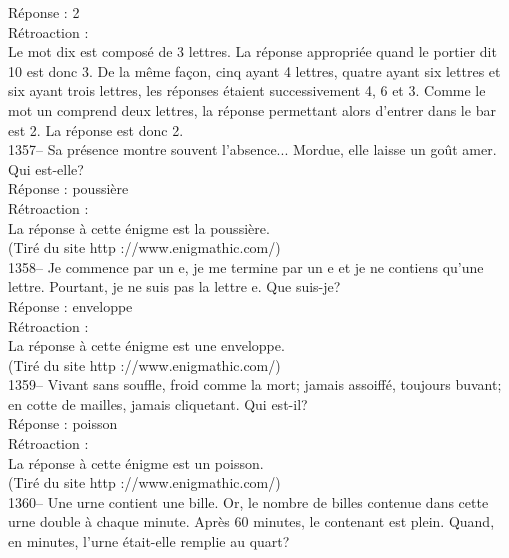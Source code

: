 ﻿\documentclass[letterpaper, 12pt]{article}
\begin{document}
R\'eponse : 2\\

R\'etroaction : \\
Le mot dix est compos\'e de 3 lettres. La r\'eponse appropri\'ee
quand le portier dit 10 est donc 3. De la m\^eme fa\c con, cinq
ayant 4 lettres, quatre ayant six lettres et six ayant trois
lettres, les r\'eponses \'etaient successivement 4, 6 et 3. Comme le
mot un comprend deux lettres, la r\'eponse permettant alors d'entrer
dans le bar est 2.
La r\'eponse est donc 2.\\

1357--  Sa pr\'esence montre souvent l'absence... Mordue, elle laisse un
go\^ut amer.  Qui est-elle?\\

R\'eponse : poussi\`ere\\

R\'etroaction : \\
La r\'eponse \`a cette \'enigme est la poussi\`ere.\\
(Tir\'e du site http ://www.enigmathic.com/)\\

1358-- Je commence par un e, je me termine par un e et je ne contiens qu'une
lettre.  Pourtant, je ne suis pas la lettre e. Que suis-je?\\

R\'eponse : enveloppe\\

R\'etroaction : \\
La r\'eponse \`a cette \'enigme est une enveloppe.\\
(Tir\'e du site http ://www.enigmathic.com/)\\

1359-- Vivant sans souffle, froid comme la mort; jamais assoiff\'e, toujours
buvant; en cotte de mailles, jamais cliquetant. Qui est-il?\\

R\'eponse : poisson\\

R\'etroaction :\\
La r\'eponse \`a cette \'enigme est un poisson.\\
(Tir\'e du site http ://www.enigmathic.com/)\\

1360--  Une urne contient une bille.  Or, le nombre de billes contenue dans
cette urne double \`a chaque minute. Apr\`es 60 minutes, le contenant est
plein.  Quand, en minutes, l'urne \'etait-elle remplie au quart?\\
\end{document}
